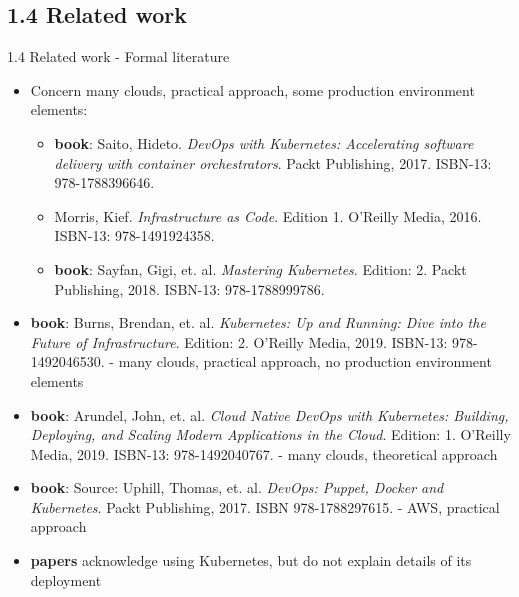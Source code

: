 \documentclass{beamer}
\begin{document}
\subsection{1.4 Related work}
\begin{frame}{1.4 Related work - Formal literature}%
\begin{itemize}
	\item Concern many clouds, practical approach, some production environment elements:
	\begin{itemize}
		\item \textbf{book}: Saito, Hideto. \textit{DevOps with Kubernetes: Accelerating software delivery with container orchestrators}. Packt Publishing, 2017. ISBN-13: 978-1788396646.
		\item Morris, Kief. \textit{Infrastructure as Code}. Edition 1. O'Reilly Media, 2016. ISBN-13: 978-1491924358.
		\item \textbf{book}: Sayfan, Gigi, et. al. \textit{Mastering Kubernetes}. Edition: 2.  Packt Publishing, 2018. ISBN-13: 978-1788999786.
	\end{itemize}
	\item \textbf{book}: Burns, Brendan, et. al. \textit{Kubernetes: Up and Running: Dive into the Future of Infrastructure}. Edition: 2. O'Reilly Media, 2019. ISBN-13: 978-1492046530. - many clouds, practical approach, no production environment elements
	\item \textbf{book}: Arundel, John, et. al. \textit{Cloud Native DevOps with Kubernetes: Building, Deploying, and Scaling Modern Applications in the Cloud}. Edition: 1. O'Reilly Media, 2019. ISBN-13: 978-1492040767. - many clouds, theoretical approach
	\item \textbf{book}: Source: Uphill, Thomas, et. al. \textit{DevOps: Puppet, Docker and Kubernetes}. Packt Publishing, 2017. ISBN 978-1788297615. - AWS, practical approach
	\item \textbf{papers} acknowledge using Kubernetes, but do not explain details of its deployment
\end{itemize}
\end{frame}
\end{document}
